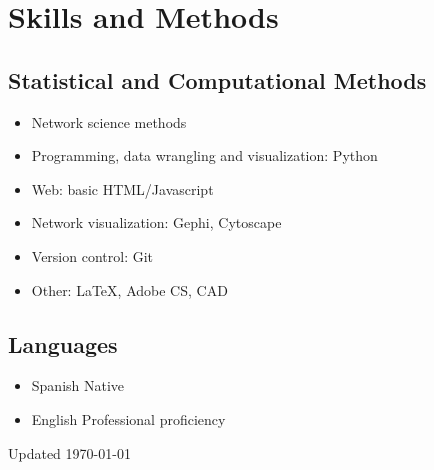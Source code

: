 \documentclass{academiccv}
\begin{document}






\section*{Skills and Methods}

\subsection*{Statistical and Computational Methods}

\begin{itemize}
	
\item Network science methods
\item Programming, data wrangling and visualization: Python
\item Web: basic HTML/Javascript
\item Network visualization: Gephi, Cytoscape
\item Version control: Git
\item Other: \LaTeX, Adobe CS, CAD

\end{itemize}


\subsection*{Languages}

\begin{itemize}
	
\item Spanish \tab Native
\item English \tab Professional proficiency 

\end{itemize}



\begin{center}
\vspace{6em}
Updated \monthyeardate\today
\end{center}
\end{document}
